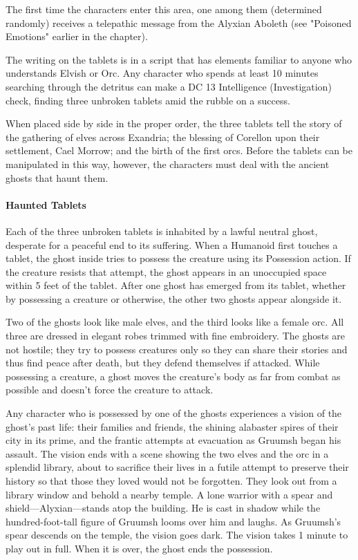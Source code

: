 \documentclass[10pt,a4paper,twoside,bg=print,twocolumn,openany,nodeprecatedcode]{dndbook}
\begin{document}
The first time the characters enter this area, one among them (determined randomly) receives a telepathic message from the Alyxian Aboleth (see "Poisoned Emotions" earlier in the chapter).

The writing on the tablets is in a script that has elements familiar to anyone who understands Elvish or Orc. Any character who spends at least 10 minutes searching through the detritus can make a DC 13 Intelligence (Investigation) check, finding three unbroken tablets amid the rubble on a success.

When placed side by side in the proper order, the three tablets tell the story of the gathering of elves across Exandria; the blessing of Corellon upon their settlement, Cael Morrow; and the birth of the first orcs. Before the tablets can be manipulated in this way, however, the characters must deal with the ancient ghosts that haunt them.

\paragraph{Haunted Tablets}
Each of the three unbroken tablets is inhabited by a lawful neutral ghost, desperate for a peaceful end to its suffering. When a Humanoid first touches a tablet, the ghost inside tries to possess the creature using its Possession action. If the creature resists that attempt, the ghost appears in an unoccupied space within 5 feet of the tablet. After one ghost has emerged from its tablet, whether by possessing a creature or otherwise, the other two ghosts appear alongside it.

Two of the ghosts look like male elves, and the third looks like a female orc. All three are dressed in elegant robes trimmed with fine embroidery. The ghosts are not hostile; they try to possess creatures only so they can share their stories and thus find peace after death, but they defend themselves if attacked. While possessing a creature, a ghost moves the creature's body as far from combat as possible and doesn't force the creature to attack.

Any character who is possessed by one of the ghosts experiences a vision of the ghost's past life: their families and friends, the shining alabaster spires of their city in its prime, and the frantic attempts at evacuation as Gruumsh began his assault. The vision ends with a scene showing the two elves and the orc in a splendid library, about to sacrifice their lives in a futile attempt to preserve their history so that those they loved would not be forgotten. They look out from a library window and behold a nearby temple. A lone warrior with a spear and shield—Alyxian—stands atop the building. He is cast in shadow while the hundred-foot-tall figure of Gruumsh looms over him and laughs. As Gruumsh's spear descends on the temple, the vision goes dark. The vision takes 1 minute to play out in full. When it is over, the ghost ends the possession.
\end{document}
